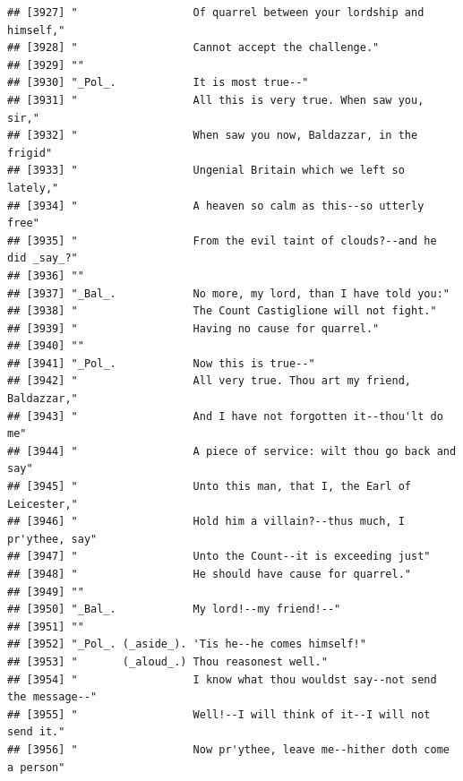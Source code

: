 \documentclass{article}\usepackage[]{graphicx}\usepackage[]{color}
\makeatletter
\newenvironment{kframe}{%
 \def\at@end@of@kframe{}%
 \ifinner\ifhmode%
  \def\at@end@of@kframe{\end{minipage}}%
  \begin{minipage}{\columnwidth}%
 \fi\fi%
 \def\FrameCommand##1{\hskip\@totalleftmargin \hskip-\fboxsep
 \colorbox{shadecolor}{##1}\hskip-\fboxsep
     \hskip-\linewidth \hskip-\@totalleftmargin \hskip\columnwidth}%
 \MakeFramed {\advance\hsize-\width
   \@totalleftmargin\z@ \linewidth\hsize
   \@setminipage}}%
 {\par\unskip\endMakeFramed%
 \at@end@of@kframe}
\newenvironment{knitrout}{}{} %
\makeatother
\begin{document}
\begin{knitrout}
\begin{kframe}
\begin{verbatim}
## [3927] "                  Of quarrel between your lordship and himself,"             
## [3928] "                  Cannot accept the challenge."                              
## [3929] ""                                                                            
## [3930] "_Pol_.            It is most true--"                                         
## [3931] "                  All this is very true. When saw you, sir,"                 
## [3932] "                  When saw you now, Baldazzar, in the frigid"                
## [3933] "                  Ungenial Britain which we left so lately,"                 
## [3934] "                  A heaven so calm as this--so utterly free"                 
## [3935] "                  From the evil taint of clouds?--and he did _say_?"         
## [3936] ""                                                                            
## [3937] "_Bal_.            No more, my lord, than I have told you:"                   
## [3938] "                  The Count Castiglione will not fight."                     
## [3939] "                  Having no cause for quarrel."                              
## [3940] ""                                                                            
## [3941] "_Pol_.            Now this is true--"                                        
## [3942] "                  All very true. Thou art my friend, Baldazzar,"             
## [3943] "                  And I have not forgotten it--thou'lt do me"                
## [3944] "                  A piece of service: wilt thou go back and say"             
## [3945] "                  Unto this man, that I, the Earl of Leicester,"             
## [3946] "                  Hold him a villain?--thus much, I pr'ythee, say"           
## [3947] "                  Unto the Count--it is exceeding just"                      
## [3948] "                  He should have cause for quarrel."                         
## [3949] ""                                                                            
## [3950] "_Bal_.            My lord!--my friend!--"                                    
## [3951] ""                                                                            
## [3952] "_Pol_. (_aside_). 'Tis he--he comes himself!"                                
## [3953] "       (_aloud_.) Thou reasonest well."                                      
## [3954] "                  I know what thou wouldst say--not send the message--"      
## [3955] "                  Well!--I will think of it--I will not send it."            
## [3956] "                  Now pr'ythee, leave me--hither doth come a person"         

\end{verbatim}
\end{kframe}
\end{knitrout}
\end{document}
